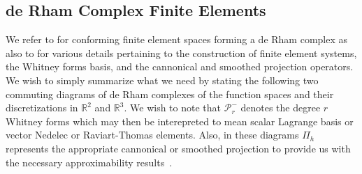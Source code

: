 \documentclass{amsart}
\theoremstyle{thmstyleone}%
\theoremstyle{thmstyletwo}%
\theoremstyle{thmstylethree}%
\def\R{\mathbb{R}}
\DeclareMathOperator{\grad}{grad}
\DeclareMathOperator{\curl}{curl}
\def\divgn{\operatorname{div}}
\DeclareMathOperator{\rot}{rot}
\begin{document}
\subsection{de Rham Complex Finite Elements}

We refer to \cite{ArFaWi2006,ArFaWi2010,Arnold2018} for conforming finite element spaces forming a de Rham complex as also to \cite{CHMuOw2011_AN,ChRa2016} for various details pertaining to the construction of finite element systems, the Whitney forms basis, and the cannonical and smoothed projection operators. We wish to simply summarize what we need by stating the following two commuting diagrams of de Rham complexes of the function spaces and their discretizations in $\R^2$ and $\R^3$. We wish to note that $\mathcal{P}_r^-$ denotes the degree $r$ Whitney forms which may then be interepreted to mean scalar Lagrange basis or vector Nedelec or Raviart-Thomas elements. Also, in these diagrams $\Pi_h$ represents the appropriate cannonical or smoothed projection to provide us with the necessary approximability results~\cite[see][Theorems 5.3, 5.6]{ArFaWi2006}.

\begin{center}
\end{center}
\end{document}
